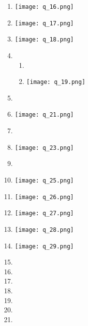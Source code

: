 \begin{enumerate}
\item \texttt{[image: q\_16.png]}

\item \texttt{[image: q\_17.png]}

\item \texttt{[image: q\_18.png]}

\item \begin{enumerate}
		\item 

		\item \texttt{[image: q\_19.png]}
\end{enumerate}

\item 

\item \texttt{[image: q\_21.png]}

\item 

\item \texttt{[image: q\_23.png]}

\item 

\item \texttt{[image: q\_25.png]}

\item \texttt{[image: q\_26.png]}

\item \texttt{[image: q\_27.png]}

\item \texttt{[image: q\_28.png]}

\item \texttt{[image: q\_29.png]}

\item 

\item 

\item 

\item 

\item 

\item 

\item 
\end{enumerate}
